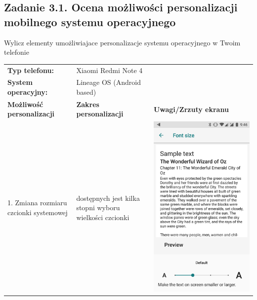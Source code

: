 \documentclass[12pt]{article}
\begin{document}
    \subsection{Zadanie 3.1. Ocena możliwości personalizacji mobilnego systemu operacyjnego}

    Wylicz elementy umożliwiajace personalizacje systemu operacyjnego w Twoim telefonie

    \begin{longtable}{|p{}|p{}|p{}|}
        \cline{1-2}
        \textbf{Typ telefonu:} & Xiaomi Redmi Note 4 \\
        \cline{1-2}
        \textbf{System operacyjny:} & Lineage OS (Android based)\\
        \hline
        \textbf{Możliwość personalizacji} & \textbf{Zakres personalizacji} & \textbf{Uwagi/Zrzuty ekranu}\\
        \hline
        1. Zmiana rozmiaru czcionki systemowej & dostępnych jest kilka stopni wyboru wielkości czcionki & \includegraphics[scale=0.1]{changefont.png}\\

\end{longtable}
\end{document}

